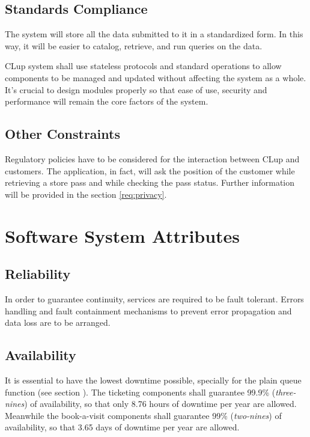 \subsection{Standards Compliance}
The system will store all the data submitted to it in a standardized form. In this way, it will be easier to catalog, retrieve, and run queries on the data.

CLup system shall use stateless protocols and standard operations to allow components to be managed and updated without affecting the system as a whole.\newline
It’s crucial to design modules properly so that ease of use, security and performance will remain the core factors of the system.

\subsection{Other Constraints}
Regulatory policies have to be considered for the interaction between CLup and customers. The application, in fact, will ask the position of the customer while retrieving a store pass and while checking the pass status. Further information will be provided in the section \ref{req:privacy}.

\section{Software System Attributes}

\subsection{Reliability}
In order to guarantee continuity, services are required to be fault tolerant. Errors handling and fault containment mechanisms to prevent error propagation and data loss are to be arranged.

\subsection{Availability}
It is essential to have the lowest downtime possible, specially for the plain queue function (see section ).
The ticketing components shall guarantee 99.9\% (\textit{three-nines}) of availability, so that only 8.76 hours of downtime per year are allowed.
Meanwhile the book-a-visit components shall guarantee 99\% (\textit{two-nines}) of availability, so that 3.65 days of downtime per year are allowed.

